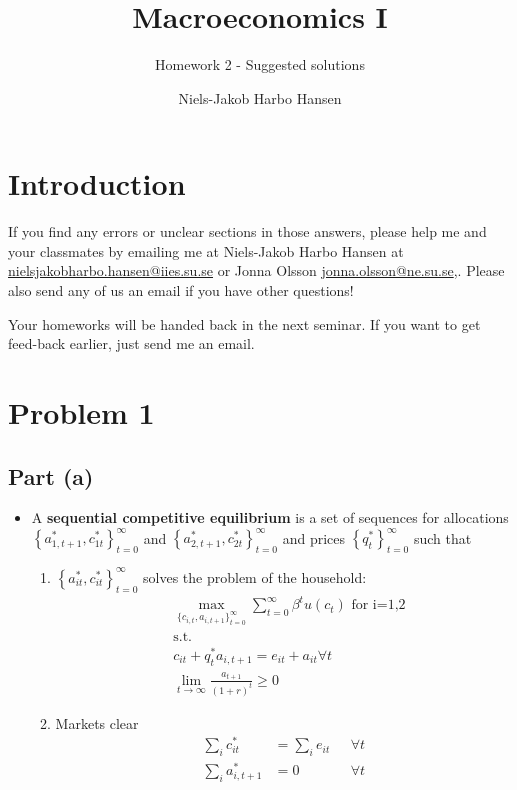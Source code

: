 \documentclass{scrartcl}
\begin{document}
\pagestyle{fancy}
\fancyhead{}
\fancyhead[LE,RO]{\thepage}
\fancyfoot{}

\title{Macroeconomics I}
\subtitle{Homework 2 - Suggested solutions}
\author{Niels-Jakob Harbo Hansen}
\maketitle

\section*{Introduction}
If you find any errors or unclear sections in those answers, please help me and your classmates by emailing me at Niels-Jakob Harbo Hansen at \url{nielsjakobharbo.hansen@iies.su.se} or Jonna Olsson \url{jonna.olsson@ne.su.se},. Please also send any of us an email if you have other questions! 

Your homeworks will be handed back in the next seminar. If you want to get feed-back earlier, just send me an email. 

\section*{Problem 1}

\subsection*{Part (a)}

\begin{itemize}
\item A \textbf{sequential competitive equilibrium} is a set of sequences for allocations $\left\{a_{1,t+1}^*, c_{1t}^*\right\}_{t=0}^{\infty}$ and $\left\{a_{2,t+1}^*, c_{2t}^*\right\}_{t=0}^{\infty}$ and prices $\left\{q_{t}^*\right\}_{t=0}^{\infty}$ such that 
	
	\begin{enumerate}
		\item $\left\{a_{it}^*, c_{it}^*\right\}_{t=0}^{\infty}$ solves the problem of the household:
		\begin{align}
		&\max_{\{{c_{i,t}, a_{i,t+1}}\}_{t=0}^{\infty}} {\sum_{t=0}^{\infty} \beta^t u(c_t)} \text{ for i=1,2}\\
		&\text{s.t. } \nonumber \\ 
		&c_{it}+q_t^* a_{i,t+1}=e_{it}+a_{it} \forall t \nonumber \\
		& \lim_{t \rightarrow \infty} \frac{a_{t+1}}{(1+r)^t} \geq 0 \nonumber 
		\end{align}
		\item Markets clear
		\begin{align}
		\sum_{i} c_{it}^*&=\sum_{i} e_{it} \text{ } &\forall t \\
		\sum_{i} a_{i,t+1}^*&=0 \text{ } &\forall t 
		\end{align}
	\end{enumerate}
	
\end{itemize}
\end{document}
